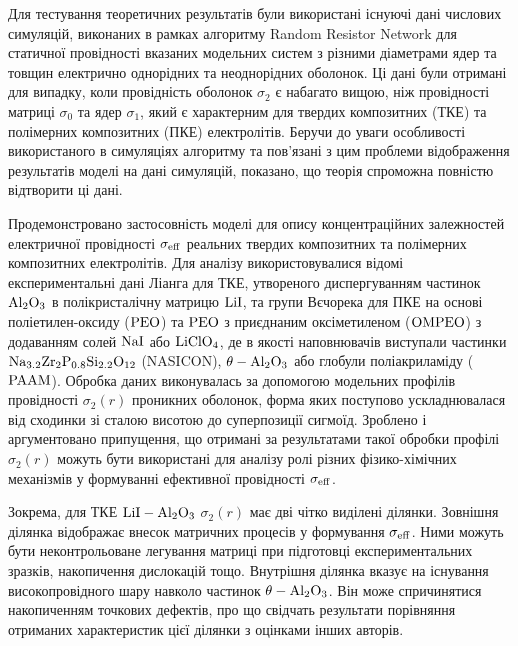 Для тестування теоретичних результатів були використані існуючі дані числових симуляцій, виконаних в рамках алгоритму Random Resistor Network для статичної провідності вказаних модельних систем  з різними діаметрами ядер та товщин електрично однорідних та неоднорідних оболонок. Ці дані були отримані для випадку, коли провідність оболонок $\sigma_2$ є набагато вищою, ніж провідності матриці $\sigma_0$ та ядер $\sigma_1$, який є характерним для твердих композитних (ТКЕ) та полімерних композитних (ПКЕ) електролітів.
Беручи до уваги  особливості  використаного в симуляціях алгоритму та пов'язані з цим проблеми відображення результатів моделі на дані симуляцій, показано, що теорія спроможна повністю відтворити ці дані.

Продемонстровано застосовність моделі для опису концентраційних залежностей електричної провідності $\sigma_{\rm eff}$ реальних твердих композитних та полімерних композитних електролітів.
Для аналізу використовувалися відомі експериментальні дані Ліанга для ТКЕ, утвореного диспергуванням частинок $\rm Al_2O_3$
в полікристалічну матрицю $\rm LiI$, та групи Вєчорека для ПКЕ на основі поліетилен-оксиду ($\rm PEO$)
та $\rm PEO$ з приєднаним оксіметиленом ($\rm OMPEO$) з додаванням солей $\rm NaI$ або $\rm LiClO_4$, де в якості наповнювачів виступали частинки $\rm Na_{3.2}Zr_2P_{0.8}Si_{2.2}O_{12}$ (NASICON), $\rm \theta-Al_2O_3$ або глобули поліакриламіду ($\rm PAAM$). 
Обробка даних виконувалась за допомогою модельних профілів  провідності $\sigma_2(r)$ проникних оболонок, форма яких поступово ускладнювалася від сходинки зі сталою висотою до суперпозиції сигмоїд.
Зроблено і аргументовано припущення, що отримані за результатами такої обробки профілі $\sigma_2(r)$ можуть бути використані для аналізу ролі різних фізико-хімічних механізмів у формуванні ефективної провідності $\sigma_{\rm eff}$. 

Зокрема, для ТКЕ $\rm LiI-Al_2O_3$ $\sigma_2(r)$ має дві чітко виділені ділянки.   Зовнішня ділянка відображає внесок матричних процесів у формування $\sigma_{\rm eff}$. Ними можуть бути неконтрольоване легування матриці при підготовці експериментальних зразків, накопичення дислокацій тощо. Внутрішня ділянка вказує на існування високопровідного шару навколо частинок $\rm \theta-Al_2O_3$. Він може спричинятися накопиченням точкових дефектів, про що свідчать результати порівняння
отриманих характеристик цієї ділянки з оцінками інших авторів.

